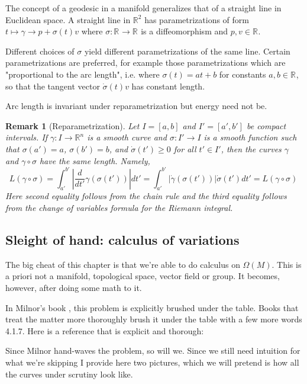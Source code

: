 \documentclass{article}
\newtheorem{rk}{Remark}
\renewcommand{\Rn}[1][n]{\mathbb{R}^{#1}}
\newcommand{\OM}{\Omega(M)}
\begin{document}
The concept of a geodesic in a manifold generalizes that of a straight line in
Euclidean space. A straight line in $\Rn[2]$ has parametrizations of form $t
\mapsto \gamma → p + \sigma(t)v$ where $\sigma : \Rn[] → \Rn[]$ is a
diffeomorphism and $p, v \in \Rn[]$.

Different choices of $\sigma$ yield different parametrizations of the same
line. Certain parametrizations are preferred, for example those
parametrizations which are "proportional to the arc length", i.e. where
$\sigma(t) = at + b$ for constants $a, b \in \Rn[]$, so that the tangent vector
$\dot{\sigma}(t)v$ has constant length.

Arc length is invariant under reparametrization but energy need not be.

\begin{rk}[Reparametrization]
    Let $I = [a, b]$ and $I' = [a', b']$ be compact intervals. If $\gamma : I
    \rightarrow \Rn$ is a smooth curve and $\sigma : I' \rightarrow I$ is a
    smooth function such that $\sigma(a') = a$, $\sigma(b') = b$, and
    $\dot{\sigma}(t') ≥ 0$ for all $t' \in I'$, then the curves $\gamma$ and
    $\gamma \circ \sigma$ have the same length. Namely,
    \[
        L(\gamma  \circ \sigma)
        = \int_{a'}^{b'} \left|\frac{d}{dt'} \gamma(\sigma(t')) \right| dt'
        = \int_{a'}^{b'} \left| \dot{\gamma}(\sigma(t')) \right| \dot{\sigma}(t') dt'
        = L(\gamma  \circ \sigma)
        \
    \]
    Here second equality follows from the chain rule and the third equality
    follows from the change of variables formula for the Riemann integral.
\end{rk}






\subsection{Sleight of hand: calculus of variations}

The big cheat of this chapter is that we're able to do calculus on $\OM$.
This is a priori not a manifold, topological space, vector field or group.
It becomes, however, after doing some math to it.

In Milnor's book \cite{milnor}, this problem is explicitly brushed under the table.
Books that treat the matter more thoroughly brush it under the table with a few more words
\cite{salamon} 4.1.7.
Here is a reference that is explicit and thorough: \cite{lee}

Since Milnor hand-waves the problem, so will we. Since we still need intuition for what we're
skipping I provide here two pictures, which we will pretend is how all the curves under scrutiny
look like.
\end{document}
